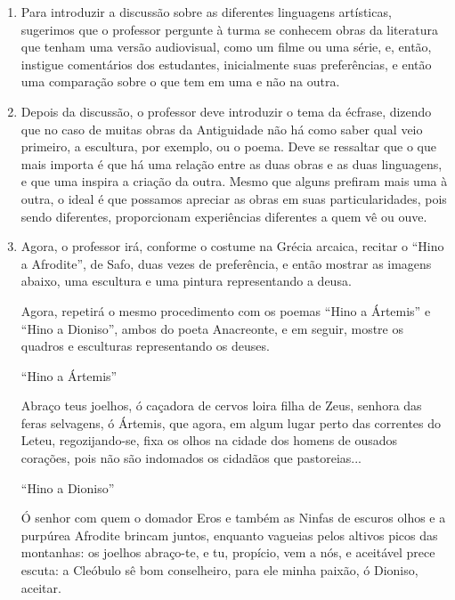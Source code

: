 \documentclass[12pt]{extarticle}
\begin{document}
\begin{enumerate}

\item
Para introduzir a discussão sobre as diferentes linguagens artísticas, sugerimos
que o professor pergunte à turma se conhecem obras da literatura que tenham
uma versão audiovisual, como um filme ou uma série, e, então, instigue comentários
dos estudantes, inicialmente suas preferências, e então uma comparação sobre o que
tem em uma e não na outra. 

\item
Depois da discussão, o professor deve introduzir o tema da écfrase, dizendo que
no caso de muitas obras da Antiguidade não há como saber qual veio primeiro,
a escultura, por exemplo, ou o poema. Deve se ressaltar que o que mais importa
é que há uma relação entre as duas obras e as duas linguagens, e que uma inspira
a criação da outra. Mesmo que alguns prefiram mais uma à outra, o ideal é que 
possamos apreciar as obras em suas particularidades, pois sendo diferentes, 
proporcionam experiências diferentes a quem vê ou ouve. 

\item
Agora, o professor irá, conforme o costume na Grécia arcaica, recitar o ``Hino
a Afrodite'', de Safo, duas vezes de preferência, e então mostrar as imagens
abaixo, uma escultura e uma pintura representando a deusa. 


Agora, repetirá o mesmo procedimento com os poemas ``Hino a Ártemis'' e 
``Hino a Dioniso'', ambos do poeta Anacreonte, e em seguir, mostre os quadros 
e esculturas representando os deuses.

``Hino a Ártemis''

Abraço teus joelhos, ó caçadora de cervos
loira filha de Zeus, senhora 
das feras selvagens, ó Ártemis,
que agora, em algum lugar perto
das correntes do Leteu, regozijando-se,
fixa os olhos na cidade dos homens
de ousados corações, pois não são indomados
os cidadãos que pastoreias...

``Hino a Dioniso''

Ó senhor com quem o domador Eros
e também as Ninfas de escuros olhos 
e a purpúrea Afrodite
brincam juntos, enquanto vagueias 
pelos altivos picos das montanhas:
os joelhos abraço-te, e tu, propício,
vem a nós, e aceitável
prece escuta:
a Cleóbulo sê bom
conselheiro, para ele minha paixão,
ó Dioniso, aceitar. 


\end{enumerate}
\end{document}
